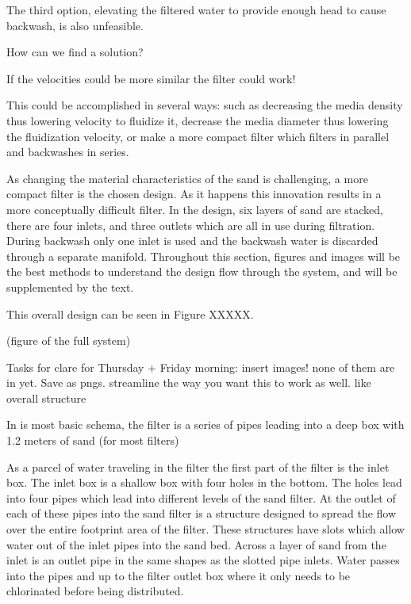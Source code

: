 \documentclass[letterpaper,10pt,english]{sphinxmanual}
\begin{document}
The third option, elevating the filtered water to provide enough head to cause backwash, is also unfeasible.


How can we find a solution?

If the velocities could be more similar the filter could work!

This could be accomplished in several ways: such as decreasing the media density thus lowering velocity to fluidize it, decrease the media diameter thus lowering the fluidization velocity, or make a more compact filter which filters in parallel and backwashes in series.

As changing the material characteristics of the sand is challenging, a more compact filter is the chosen design. As it happens this innovation results in a more conceptually difficult filter. In the design, six layers of sand are stacked, there are four inlets, and three outlets which are all in use during filtration. During backwash only one inlet is used and the backwash water is discarded through a separate manifold. Throughout this section, figures and images will be the best methods to understand the design flow through the system, and will be supplemented by the text.

This overall design can be seen in Figure XXXXX.

(figure of the full system)

Tasks for clare for Thursday + Friday morning: insert images! none of them are in yet. Save as pngs. streamline the way you want this to work as well. like overall structure

In is most basic schema, the filter is a series of pipes leading into a deep box with 1.2 meters of sand (for most filters)

As a parcel of water traveling in the filter the first part of the filter is the inlet box. The inlet box is a shallow box with four holes in the bottom. The holes lead into four pipes which lead into different levels of the sand filter. At the outlet of each of these pipes into the sand filter is a structure designed to spread the flow over the entire footprint area of the filter. These structures have slots which allow water out of the inlet pipes into the sand bed. Across a layer of sand from the inlet is an outlet pipe in the same shapes as the slotted pipe inlets. Water passes into the pipes and up to the filter outlet box where it only needs to be chlorinated before being distributed.
\end{document}
